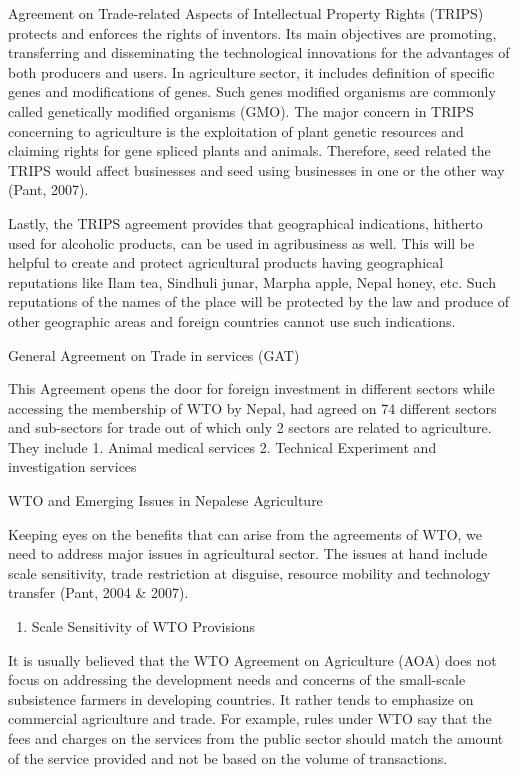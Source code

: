 \documentclass[]{book}
\providecommand{\tightlist}{%
  \setlength{\itemsep}{0pt}\setlength{\parskip}{0pt}}
\begin{document}
Agreement on Trade-related Aspects of Intellectual Property Rights (TRIPS) protects and enforces the rights of inventors. Its main objectives are promoting, transferring and disseminating the technological innovations for the advantages of both producers and users. In agriculture sector, it includes definition of specific genes and modifications of genes. Such genes modified organisms are commonly called genetically modified organisms (GMO). The major concern in TRIPS concerning to agriculture is the exploitation of plant genetic resources and claiming rights for gene spliced plants and animals. Therefore, seed related the TRIPS would affect businesses and seed using businesses in one or the other way (Pant, 2007).

Lastly, the TRIPS agreement provides that geographical indications, hitherto used for alcoholic products, can be used in agribusiness as well. This will be helpful to create and protect agricultural products having geographical reputations like Ilam tea, Sindhuli junar, Marpha apple, Nepal honey, etc. Such reputations of the names of the place will be protected by the law and produce of other geographic areas and foreign countries cannot use such indications.

General Agreement on Trade in services (GAT)

This Agreement opens the door for foreign investment in different sectors while accessing the membership of WTO by Nepal, had agreed on 74 different sectors and sub-sectors for trade out of which only 2 sectors are related to agriculture. They include
1. Animal medical services
2. Technical Experiment and investigation services

WTO and Emerging Issues in Nepalese Agriculture

Keeping eyes on the benefits that can arise from the agreements of WTO, we need to address major issues in agricultural sector. The issues at hand include scale sensitivity, trade restriction at disguise, resource mobility and technology transfer (Pant, 2004 \& 2007).

\begin{enumerate}
\def\labelenumi{\arabic{enumi}.}
\tightlist
\item
  Scale Sensitivity of WTO Provisions
\end{enumerate}

It is usually believed that the WTO Agreement on Agriculture (AOA) does not focus on addressing the development needs and concerns of the small-scale subsistence farmers in developing countries. It rather tends to emphasize on commercial agriculture and trade. For example, rules under WTO say that the fees and charges on the services from the public sector should match the amount of the service provided and not be based on the volume of transactions.
\end{document}
